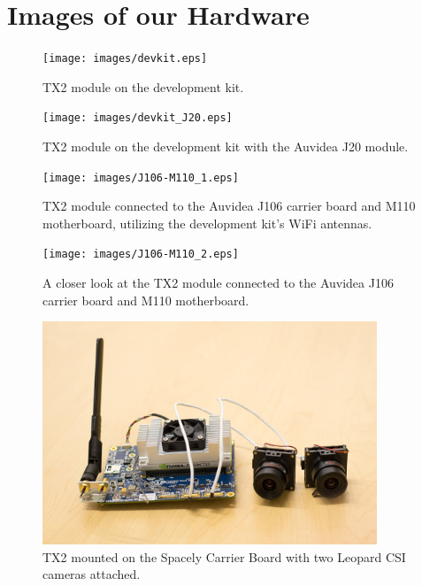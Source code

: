 \documentclass[letterpaper,10pt,serif,draftclsnofoot,onecolumn,compsoc,titlepage]{IEEEtran}
\begin{document}
\section{Images of our Hardware}

\begin{figure}[H]
	\centering
	\label{fig:TX2 module on the development kit.}
	\texttt{[image: images/devkit.eps]}
	\caption{TX2 module on the development kit. \label{overflow}}
\end{figure}


\begin{figure}[H]
	\centering
	\label{fig:TX2 module on the development kit with the Auvidea J20 module.}
	\texttt{[image: images/devkit\_J20.eps]}
	\caption{TX2 module on the development kit with the Auvidea J20 module. \label{overflow}}
\end{figure}


\begin{figure}[H]
	\centering
	\label{fig:TX2 module connected to the Auvidea J106 carrier board and M110 motherboard, utilizing the development kit's WiFi antennas.}
	\texttt{[image: images/J106-M110\_1.eps]}
	\caption{TX2 module connected to the Auvidea J106 carrier board and M110 motherboard, utilizing the development kit's WiFi antennas. \label{overflow}}
\end{figure}


\begin{figure}[H]
	\centering
	\label{fig:A closer look at the TX2 module connected to the Auvidea J106 carrier board and M110 motherboard.}
	\texttt{[image: images/J106-M110\_2.eps]}
	\caption{A closer look at the TX2 module connected to the Auvidea J106 carrier board and M110 motherboard. \label{overflow}}
\end{figure}

\begin{figure}[H]
	\centering
	\label{fig:TX2 mounted on the Spacely Carrier Board with two CSI cameras attached.}
	\includegraphics[width=10cm]{images/spacely.eps}
	\caption{TX2 mounted on the Spacely Carrier Board with two Leopard CSI cameras attached. \label{overflow}}
\end{figure}

%
%
\end{document}
